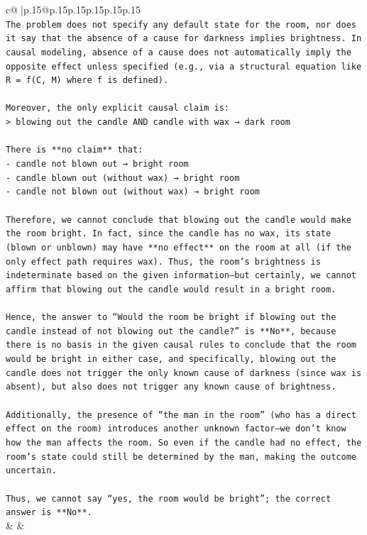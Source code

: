\documentclass{article}
\begin{document}
{\begin{supertabular}{c@{$\;$}|p{.15\linewidth}@{}p{.15\linewidth}p{.15\linewidth}p{.15\linewidth}p{.15\linewidth}p{.15\linewidth}}
{{{\\ 
\texttt{The problem does not specify any default state for the room, nor does it say that the absence of a cause for darkness implies brightness. In causal modeling, absence of a cause does not automatically imply the opposite effect unless specified (e.g., via a structural equation like R = f(C, M) where f is defined).} \\
\\ 
\texttt{Moreover, the only explicit causal claim is:  } \\
\texttt{> blowing out the candle AND candle with wax → dark room} \\
\\ 
\texttt{There is **no claim** that:  } \\
\texttt{{-} candle not blown out → bright room  } \\
\texttt{{-} candle blown out (without wax) → bright room  } \\
\texttt{{-} candle not blown out (without wax) → bright room} \\
\\ 
\texttt{Therefore, we cannot conclude that blowing out the candle would make the room bright. In fact, since the candle has no wax, its state (blown or unblown) may have **no effect** on the room at all (if the only effect path requires wax). Thus, the room’s brightness is indeterminate based on the given information—but certainly, we cannot affirm that blowing out the candle would result in a bright room.} \\
\\ 
\texttt{Hence, the answer to “Would the room be bright if blowing out the candle instead of not blowing out the candle?” is **No**, because there is no basis in the given causal rules to conclude that the room would be bright in either case, and specifically, blowing out the candle does not trigger the only known cause of darkness (since wax is absent), but also does not trigger any known cause of brightness.} \\
\\ 
\texttt{Additionally, the presence of “the man in the room” (who has a direct effect on the room) introduces another unknown factor—we don’t know how the man affects the room. So even if the candle had no effect, the room’s state could still be determined by the man, making the outcome uncertain.} \\
\\ 
\texttt{Thus, we cannot say “yes, the room would be bright”; the correct answer is **No**.} \\
            }
        }
    }
    & & \\ \\


\end{supertabular}}
\end{document}
